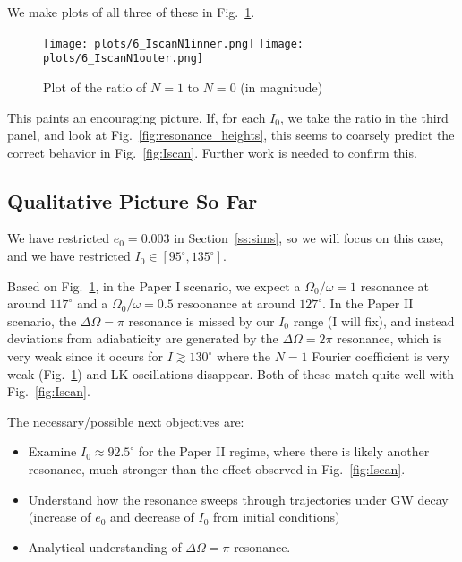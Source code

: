 \documentclass[11pt,
        usenames, %
        dvipsnames %
    ]{article}
\begin{document}
We make plots of all three of these in Fig.~\ref{fig:IscanN1}.
\begin{figure}
    \centering
    \texttt{[image: plots/6\_IscanN1inner.png]}
    \texttt{[image: plots/6\_IscanN1outer.png]}
    \caption{Plot of the ratio of $N = 1$ to $N = 0$ (in magnitude) }\label{fig:IscanN1}
\end{figure}

This paints an encouraging picture. If, for each $I_0$, we take the ratio in the
third panel, and look at Fig.~\ref{fig:resonance_heights}, this seems to
coarsely predict the correct behavior in Fig.~\ref{fig:Iscan}. Further work is
needed to confirm this.

\subsection{Qualitative Picture So Far}

We have restricted $e_0 = 0.003$ in Section~\ref{ss:sims}, so we will focus on
this case, and we have restricted $I_0 \in [95^\circ, 135^\circ]$.

Based on Fig.~\ref{fig:IscanN1}, in the Paper I scenario, we expect a
$\Omega_0/\omega = 1$ resonance at around $117^\circ$ and a $\Omega_0/\omega =
0.5$ resoonance at around $127^\circ$. In the Paper II scenario, the
$\Delta \Omega = \pi$ resonance is missed by our $I_0$ range (I will fix), and
instead deviations from adiabaticity are generated by the $\Delta \Omega = 2\pi$
resonance, which is very weak since it occurs for $I \gtrsim 130^\circ$ where
the $N = 1$ Fourier coefficient is very weak (Fig.~\ref{fig:IscanN1}) and LK
oscillations disappear. Both of these match quite well with
Fig.~\ref{fig:Iscan}.

The necessary/possible next objectives are:
\begin{itemize}
    \item Examine $I_0 \approx 92.5^\circ$ for the Paper II regime, where there
        is likely another resonance, much stronger than the effect observed in
        Fig.~\ref{fig:Iscan}.
    \item Understand how the resonance sweeps through trajectories under GW
        decay (increase of $e_0$ and decrease of $I_0$ from initial conditions)
    \item Analytical understanding of $\Delta \Omega = \pi$ resonance.
\end{itemize}
\end{document}
